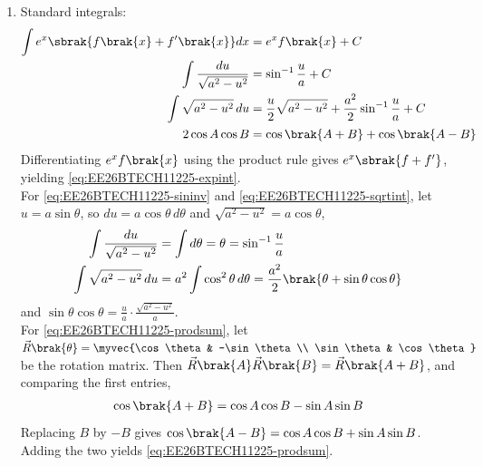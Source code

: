 \begin{enumerate}[label=\thesubsection.\arabic*, ref=\thesubsection.\theenumi]
\item Standard integrals:
\begin{align}
	\int e^x\sbrak{f\brak{x} + f^{\prime}\brak{x}}dx &= e^x f\brak{x} + C
	\label{eq:EE26BTECH11225-expint}
	\\
	\int \frac{du}{\sqrt{a^2 - u^2}} &= \sin^{-1}\frac{u}{a} + C
	\label{eq:EE26BTECH11225-sininv}
	\\
	\int \sqrt{a^2 - u^2}\,du &= \frac{u}{2}\sqrt{a^2 - u^2} + \frac{a^2}{2}\sin^{-1}\frac{u}{a} + C
	\label{eq:EE26BTECH11225-sqrtint}
	\\
	2\cos A\cos B &= \cos\brak{A + B} + \cos\brak{A - B}
	\label{eq:EE26BTECH11225-prodsum}
\end{align}
\solution
Differentiating $e^x f\brak{x}$ using the product rule gives $e^x\sbrak{f + f^{\prime}}$, yielding \eqref{eq:EE26BTECH11225-expint}.
\\
For \eqref{eq:EE26BTECH11225-sininv} and \eqref{eq:EE26BTECH11225-sqrtint}, let $u = a\sin\theta$, so $du = a\cos\theta\,d\theta$ and $\sqrt{a^2 - u^2} = a\cos\theta$,
\begin{align}
	\int \frac{du}{\sqrt{a^2 - u^2}} &= \int d\theta = \theta = \sin^{-1}\frac{u}{a}
	\\
	\int \sqrt{a^2 - u^2}\,du &= a^2\int\cos^2\theta\,d\theta
	= \frac{a^2}{2}\brak{\theta + \sin\theta\cos\theta}
\end{align}
and $\sin\theta\cos\theta = \frac{u}{a}\cdot\frac{\sqrt{a^2 - u^2}}{a}$.
\\
For \eqref{eq:EE26BTECH11225-prodsum}, let $\vec{R}\brak{\theta} = \myvec{\cos\theta & -\sin\theta \\ \sin\theta & \cos\theta}$ be the rotation matrix. Then $\vec{R}\brak{A}\vec{R}\brak{B} = \vec{R}\brak{A + B}$, and comparing the first entries,
\begin{align}
	\cos\brak{A + B} = \cos A\cos B - \sin A\sin B
\end{align}
Replacing $B$ by $-B$ gives $\cos\brak{A - B} = \cos A\cos B + \sin A\sin B$. Adding the two yields \eqref{eq:EE26BTECH11225-prodsum}.


\end{enumerate}
